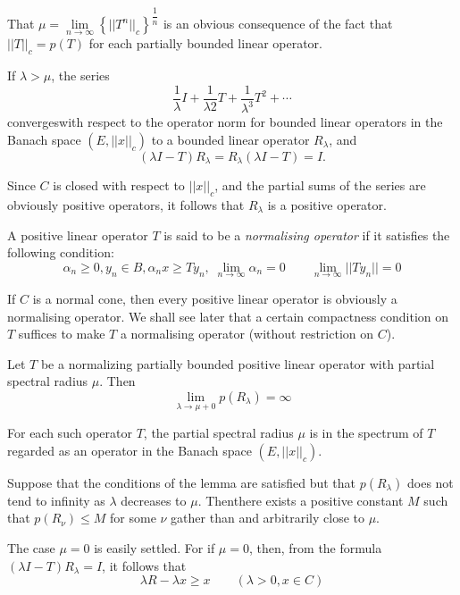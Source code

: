 That $\mu = \lim\limits_{n \to \infty}\left\{ || T^n
||_c\right\}^{\dfrac{1}{n}}$ is an obvious consequence of the fact
that $|| T ||_c = p(T)$ for each partially bounded linear operator. 

If $\lambda > \mu$, the series
$$
\frac{1}{\lambda} I + \frac{1}{\lambda 2} T + \frac{1}{\lambda^3} T^2
+ \cdots 
$$
converges\pageoriginale with respect to the operator norm for bounded
linear operators in the Banach space $(E, ||x||_c)$ to a bounded
linear operator $R_ \lambda$, and   
$$
(\lambda I - T) R_ \lambda = R_ \lambda (\lambda I - T) = I.
$$

Since $C$ is closed with respect to $|| x ||_c$, and the partial sums
of the series are obviously positive operators, it follows that $R_
\lambda $ is a positive operator. 

\begin{Definition}%
  A positive linear operator $T$ is said to be a {\em normalising
    operator} if it satisfies the following condition: 
  $$
  \alpha_n \geq 0, y_n \in B, \alpha_n x \geq Ty_n, \; \lim_{n \to
    \infty} \alpha_n = 0 \qquad \lim_{n \to \infty} || Ty_n || = 0 
  $$
\end{Definition}

If $C$ is a normal cone, then every positive linear operator is
obviously a normalising operator. We shall see later that a certain
compactness condition on $T$ suffices to make $T$ a normalising
operator (without restriction on $C$). 

\begin{lemma}\label{chap5:lem5.3}%
  Let $T$ be a normalizing partially bounded positive linear operator
  with partial spectral radius $\mu$. Then 
  $$
  \lim_{\lambda \to \mu + 0} p(R_ \lambda) = \infty
  $$
\end{lemma}

\begin{coro*}%
  For each such operator $T$, the partial spectral radius $\mu$ is in
  the spectrum of $T$ regarded as an operator in the Banach space $(E,
  || x ||_c)$. 
\end{coro*}

Suppose that the conditions of the lemma are satisfied but that $p (R_
\lambda)$ does not tend to infinity as $\lambda$ decreases to
$\mu$. Then\pageoriginale there exists a positive constant $M$ such
that $p(R_\nu) \leq M$ for some $\nu$ gather than and arbitrarily
close to $\mu$.  

The case $\mu = 0$ is easily settled. For if $\mu = 0$, then, from the
formula $(\lambda I - T) R_ \lambda = I$, it follows that 
\begin{equation*}
  \lambda R- \lambda x \geq x \qquad (\lambda > 0, x \in C)
  \tag{1}\label{chap5:eq1} 
\end{equation*}

